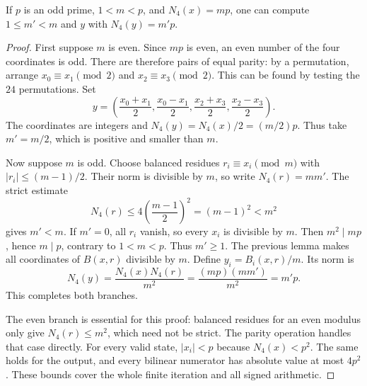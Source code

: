 \begin{lemma}
\label{qr:four-descent}
If $p$ is an odd prime, $1<m<p$, and $N_4(x)=mp$, one can
compute $1\le m'<m$ and $y$ with $N_4(y)=m'p$.
\end{lemma}
\begin{proof}
First suppose $m$ is even. Since $mp$ is even, an even number of
the four coordinates is odd. There are therefore pairs of equal parity:
by a permutation, arrange $x_0\equiv x_1\pmod2$ and
$x_2\equiv x_3\pmod2$. This can be found by testing the $24$
permutations. Set
\[
 y=\left(\frac{x_0+x_1}{2},\frac{x_0-x_1}{2},
          \frac{x_2+x_3}{2},\frac{x_2-x_3}{2}\right).
\]
The coordinates are integers and
$N_4(y)=N_4(x)/2=(m/2)p$. Thus take $m'=m/2$, which is
positive and smaller than $m$.

Now suppose $m$ is odd. Choose balanced residues
$r_i\equiv x_i\pmod m$ with $|r_i|\le(m-1)/2$.
Their norm is divisible by $m$, so write $N_4(r)=mm'$.
The strict estimate
\[
 N_4(r)\le4\left(\frac{m-1}{2}\right)^2=(m-1)^2<m^2
\]
gives $m'<m$. If $m'=0$, all $r_i$ vanish, so every $x_i$
is divisible by $m$. Then $m^2\mid mp$, hence $m\mid p$,
contrary to $1<m<p$. Thus $m'\ge1$. The previous lemma makes
all coordinates of $B(x,r)$ divisible by $m$. Define
$y_i=B_i(x,r)/m$. Its norm is
\[
 N_4(y)=\frac{N_4(x)N_4(r)}{m^2}
        =\frac{(mp)(mm')}{m^2}=m'p.
\]
This completes both branches.

The even branch is essential for this proof: balanced residues for an
even modulus only give $N_4(r)\le m^2$, which need not be strict.
The parity operation handles that case directly. For every valid state,
$|x_i|<p$ because $N_4(x)<p^2$. The same holds for the output,
and every bilinear numerator has absolute value at most $4p^2$.
These bounds cover the whole finite iteration and all signed arithmetic.
\end{proof}

